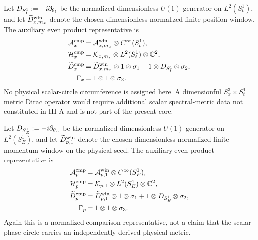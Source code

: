 \documentclass[12pt,a4paper]{article}
\begin{document}
\begin{definition}
\label{p3:def:pos_triple_4d}
Let \(D_{S^1_t}:=-i\partial_{\theta_t}\) be the normalized dimensionless
\(U(1)\) generator on \(L^2(S^1_t)\), and let
\(\widetilde D^{\rm win}_{x,m_x}\) denote the chosen dimensionless normalized
finite position window.  The auxiliary even product representative is
\begin{align}
\mathcal A_x^{\rm cmp}&=\mathcal A_{x,m_x}^{\rm win}\otimes C^\infty(S^1_t),\\
\mathcal H_x^{\rm cmp}&=\mathcal K_{x,m_x}\otimes L^2(S^1_t)\otimes\mathbb C^2,\\
\widetilde D_x^{\rm cmp}&=\widetilde D^{\rm win}_{x,m_x}\otimes1\otimes\sigma_1
 +1\otimes D_{S^1_t}\otimes\sigma_2,\\
\Gamma_x&=1\otimes1\otimes\sigma_3.
\end{align}
No physical scalar-circle circumference is assigned here.  A dimensionful
\(S^3_x\times S^1_t\) metric Dirac operator would require additional scalar
spectral-metric data not constituted in III-A and is not part of the present
core.
\end{definition}

\begin{definition}
\label{p3:def:mom_triple_4d}
Let \(D_{S^1_E}:=-i\partial_{\theta_E}\) be the normalized dimensionless
\(U(1)\) generator on \(L^2(S^1_E)\), and let
\(\widetilde D^{\rm win}_{p,1}\) denote the chosen dimensionless normalized
finite momentum window on the physical seed.  The auxiliary even product
representative is
\begin{align}
\mathcal A_p^{\rm cmp}&=\mathcal A_{p,1}^{\rm win}\otimes C^\infty(S^1_E),\\
\mathcal H_p^{\rm cmp}&=\mathcal K_{p,1}\otimes L^2(S^1_E)\otimes\mathbb C^2,\\
\widetilde D_p^{\rm cmp}&=\widetilde D^{\rm win}_{p,1}\otimes1\otimes\sigma_1
 +1\otimes D_{S^1_E}\otimes\sigma_2,\\
\Gamma_p&=1\otimes1\otimes\sigma_3.
\end{align}
Again this is a normalized comparison representative, not a claim that the
scalar phase circle carries an independently derived physical metric.
\end{definition}
\end{document}
